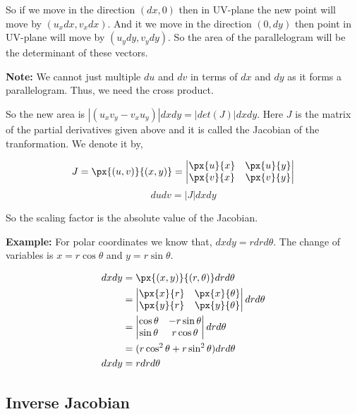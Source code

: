So if we move in the direction $(dx, 0)$ then in UV-plane the new point will move by $(u_x dx, v_x dx)$.
And it we move in the direction $(0, dy)$ then point in UV-plane will move by $(u_y dy, v_y dy)$.
So the area of the parallelogram will be the determinant of these vectors.

{\bf Note:} We cannot just multiple $du$ and $dv$ in terms of $dx$ and $dy$ as it forms a parallelogram. 
Thus, we need the cross product.

So the new area is $|(u_x v_y - v_x u_y)| dx dy = |det(J)| dx dy$.
Here $J$ is the matrix of the partial derivatives given above and it is called the Jacobian of the tranformation.
We denote it by,

$$
J = \px{(u, v)}{(x, y)} = 
\begin{vmatrix}
    \px{u}{x} & \px{u}{y} \\
    \px{v}{x} & \px{v}{y} \\    
\end{vmatrix}
$$
$$
du dv = | J | dx dy
$$

So the scaling factor is the absolute value of the Jacobian.

{\bf Example: } For polar coordinates we know that, $dx dy = r dr d\theta$.
The change of variables is $x = r \cos \theta$ and $y = r \sin \theta$.

\begin{align*}
    dx dy 
        & = \px{(x, y)}{(r, \theta)} dr d\theta \\
        & = \begin{vmatrix}
            \px{x}{r} & \px{x}{\theta} \\
            \px{y}{r} & \px{y}{\theta} \\
        \end{vmatrix} dr d\theta \\
        & = \begin{vmatrix}
            \cos \theta & - r \sin \theta \\
            \sin \theta & r \cos \theta \\
        \end{vmatrix} dr d\theta \\
        & = (r \cos^2 \theta + r \sin^2 \theta) dr d\theta \\
    dx dy & = r dr d\theta
\end{align*}


\subsection{Inverse Jacobian}

